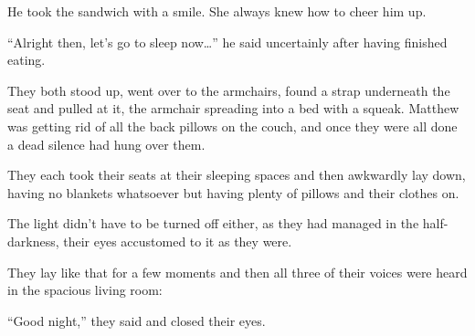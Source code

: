 He took the sandwich with a smile. She always knew how to cheer him up.

“Alright then, let's go to sleep now…” he said uncertainly after having finished eating.

They both stood up, went over to the armchairs, found a strap underneath the seat and pulled at it, the armchair spreading into a bed with a squeak. Matthew was getting rid of all the back pillows on the couch, and once they were all done a dead silence had hung over them.

They each took their seats at their sleeping spaces and then awkwardly lay down, having no blankets whatsoever but having plenty of pillows and their clothes on.

The light didn't have to be turned off either, as they had managed in the half-darkness, their eyes accustomed to it as they were.

They lay like that for a few moments and then all three of their voices were heard in the spacious living room:

“Good night,” they said and closed their eyes.